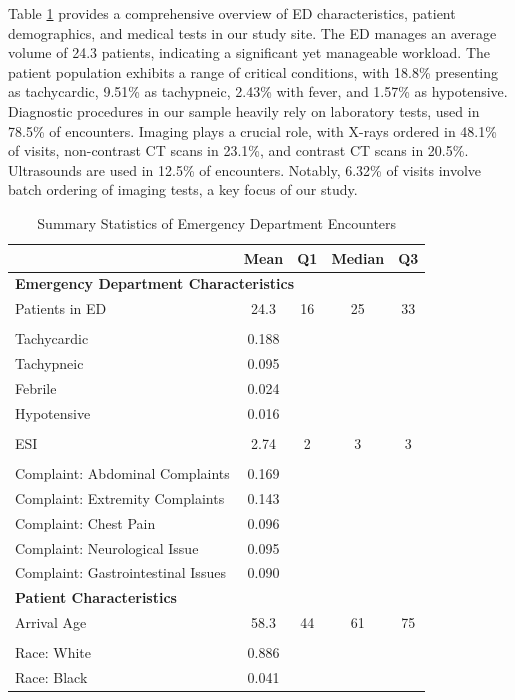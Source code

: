 \documentclass{article}
\begin{document}
Table \ref{tab:summary_statistics} provides a comprehensive overview of
ED characteristics, patient demographics, and medical tests in our study
site. The ED manages an average volume of 24.3 patients, indicating a
significant yet manageable workload. The patient population exhibits a
range of critical conditions, with 18.8\% presenting as tachycardic,
9.51\% as tachypneic, 2.43\% with fever, and 1.57\% as hypotensive.
Diagnostic procedures in our sample heavily rely on laboratory tests,
used in 78.5\% of encounters. Imaging plays a crucial role, with X-rays
ordered in 48.1\% of visits, non-contrast CT scans in 23.1\%, and
contrast CT scans in 20.5\%. Ultrasounds are used in 12.5\% of
encounters. Notably, 6.32\% of visits involve batch ordering of imaging
tests, a key focus of our study.

\begin{table}[ht]
\centering
\caption{Summary Statistics of Emergency Department Encounters}
\label{tab:summary_statistics}
\begin{tabular}{p{10.5cm}cccc}
\toprule
\textbf{} & \textbf{Mean} & \textbf{Q1} & \textbf{Median} & \textbf{Q3} \\
\midrule
\multicolumn{5}{l}{\textbf{Emergency Department Characteristics}} \\
Patients in ED & 24.3 & 16 & 25 & 33 \\
\\
Tachycardic & 0.188 & & & \\
Tachypneic & 0.095 & & & \\
Febrile & 0.024 & & & \\
Hypotensive & 0.016 & & & \\
\\
ESI & 2.74 & 2 & 3 & 3 \\
\\
Complaint: Abdominal Complaints & 0.169 & & & \\
Complaint: Extremity Complaints & 0.143 & & & \\
Complaint: Chest Pain & 0.096 & & & \\
Complaint: Neurological Issue & 0.095 & & & \\
Complaint: Gastrointestinal Issues & 0.090 & & & \\
\midrule
\multicolumn{5}{l}{\textbf{Patient Characteristics}} \\
Arrival Age & 58.3 & 44 & 61 & 75 \\
\\
Race: White & 0.886 & & & \\
Race: Black & 0.041 & & & \\

\end{tabular}
\end{table}
\end{document}
